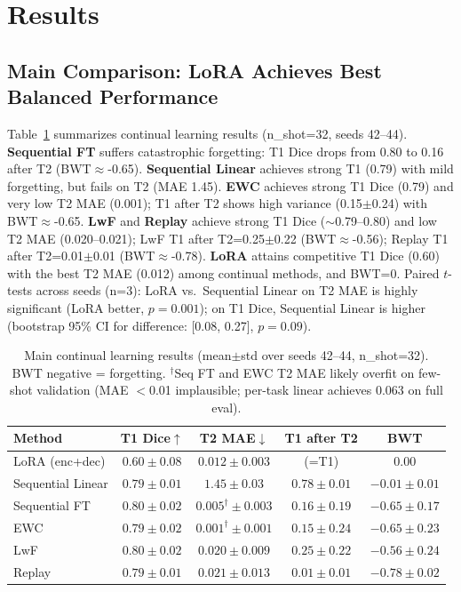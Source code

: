 \section{Results}
\label{sec:results}

\subsection{Main Comparison: LoRA Achieves Best Balanced Performance}
\label{sec:main}

Table~\ref{tab:main} summarizes continual learning results (n\_shot=32, seeds 42--44). \textbf{Sequential FT} suffers catastrophic forgetting: T1 Dice drops from 0.80 to 0.16 after T2 (BWT$\approx$-0.65). \textbf{Sequential Linear} achieves strong T1 (0.79) with mild forgetting, but fails on T2 (MAE 1.45). \textbf{EWC} achieves strong T1 Dice (0.79) and very low T2 MAE (0.001); T1 after T2 shows high variance (0.15$\pm$0.24) with BWT$\approx$-0.65. \textbf{LwF} and \textbf{Replay} achieve strong T1 Dice ($\sim$0.79--0.80) and low T2 MAE (0.020--0.021); LwF T1 after T2=0.25$\pm$0.22 (BWT$\approx$-0.56); Replay T1 after T2=0.01$\pm$0.01 (BWT$\approx$-0.78). \textbf{LoRA} attains competitive T1 Dice (0.60) with the best T2 MAE (0.012) among continual methods, and BWT=0. Paired $t$-tests across seeds (n=3): LoRA vs.\ Sequential Linear on T2 MAE is highly significant (LoRA better, $p=0.001$); on T1 Dice, Sequential Linear is higher (bootstrap 95\% CI for difference: [0.08, 0.27], $p=0.09$).

\begin{table}[t]
\caption{Main continual learning results (mean$\pm$std over seeds 42--44, n\_shot=32). BWT negative = forgetting. $^\dagger$Seq FT and EWC T2 MAE likely overfit on few-shot validation (MAE $<$0.01 implausible; per-task linear achieves 0.063 on full eval).}
\label{tab:main}
\centering
\begin{tabular}{lcccc}
\toprule
Method & T1 Dice$\uparrow$ & T2 MAE$\downarrow$ & T1 after T2 & BWT \\
\midrule
LoRA (enc+dec) & $0.60 \pm 0.08$ & $0.012 \pm 0.003$ & (=T1) & $\mathbf{0.00}$ \\
Sequential Linear & $0.79 \pm 0.01$ & $1.45 \pm 0.03$ & $0.78 \pm 0.01$ & $-0.01 \pm 0.01$ \\
Sequential FT & $0.80 \pm 0.02$ & $0.005^\dagger \pm 0.003$ & $0.16 \pm 0.19$ & $-0.65 \pm 0.17$ \\
EWC & $0.79 \pm 0.02$ & $0.001^\dagger \pm 0.001$ & $0.15 \pm 0.24$ & $-0.65 \pm 0.23$ \\
LwF & $0.80 \pm 0.02$ & $0.020 \pm 0.009$ & $0.25 \pm 0.22$ & $-0.56 \pm 0.24$ \\
Replay & $0.79 \pm 0.01$ & $0.021 \pm 0.013$ & $0.01 \pm 0.01$ & $-0.78 \pm 0.02$ \\
\bottomrule
\end{tabular}
\end{table}

